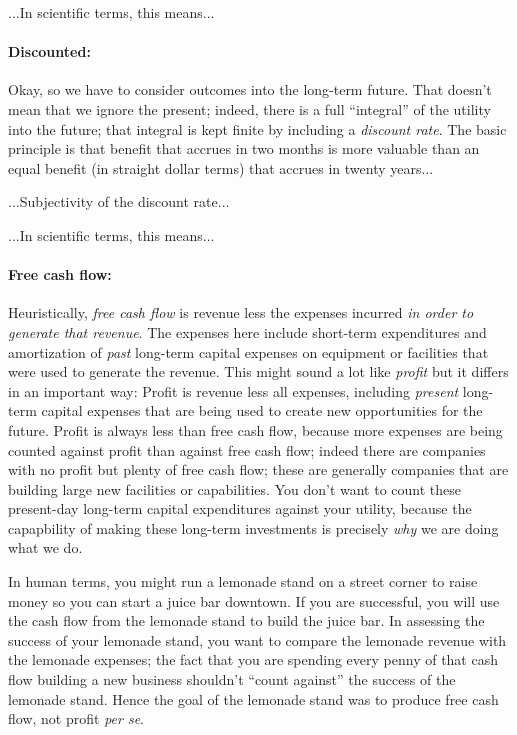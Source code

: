 \documentclass[12pt,twoside,pdftex]{article}
\begin{document}
...In scientific terms, this means...

\paragraph{Discounted:}
Okay, so we have to consider outcomes into the long-term future.  That
doesn't mean that we ignore the present; indeed, there is a full
``integral'' of the utility into the future; that integral is kept
finite by including a \emph{discount rate}.  The basic principle is
that benefit that accrues in two months is more valuable than an equal
benefit (in straight dollar terms) that accrues in twenty years...

...Subjectivity of the discount rate...

...In scientific terms, this means...

\paragraph{Free cash flow:}
Heuristically, \emph{free cash flow} is revenue less the expenses
incurred \emph{in order to generate that revenue}.  The expenses here
include short-term expenditures and amortization of \emph{past}
long-term capital expenses on equipment or facilities that were used
to generate the revenue.  This might sound a lot like \emph{profit}
but it differs in an important way: Profit is revenue less all
expenses, including \emph{present} long-term capital expenses that are
being used to create new opportunities for the future.  Profit is
always less than free cash flow, because more expenses are being
counted against profit than against free cash flow; indeed there are
companies with no profit but plenty of free cash flow; these are
generally companies that are building large new facilities or
capabilities.  You don't want to count these present-day long-term
capital expenditures against your utility, because the capapbility of
making these long-term investments is precisely \emph{why} we are
doing what we do.

In human terms, you might run a lemonade stand on a street corner to
raise money so you can start a juice bar downtown.  If you are
successful, you will use the cash flow from the lemonade stand to
build the juice bar.  In assessing the success of your lemonade stand,
you want to compare the lemonade revenue with the lemonade expenses;
the fact that you are spending every penny of that cash flow building
a new business shouldn't ``count against'' the success of the lemonade
stand.  Hence the goal of the lemonade stand was to produce free cash
flow, not profit \emph{per se}.
\end{document}
